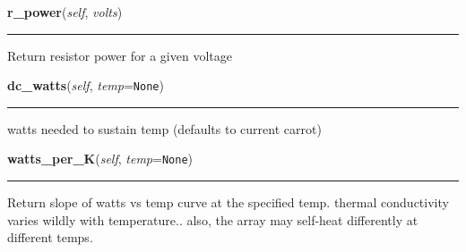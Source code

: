     \vspace{0.5ex}

    \begin{boxedminipage}{\textwidth}

    \raggedright \textbf{r\_power}(\textit{self}, \textit{volts})

    \vspace{-1.5ex}

    \rule{\textwidth}{0.5\fboxrule}
    Return resistor power for a given voltage

    \vspace{1ex}

    \end{boxedminipage}

    \label{tempcontrol:tcontroller:dc_watts}

    \vspace{0.5ex}

    \begin{boxedminipage}{\textwidth}

    \raggedright \textbf{dc\_watts}(\textit{self}, \textit{temp}=\texttt{None})

    \vspace{-1.5ex}

    \rule{\textwidth}{0.5\fboxrule}
    watts needed to sustain temp (defaults to current carrot)

    \vspace{1ex}

    \end{boxedminipage}

    \label{tempcontrol:tcontroller:watts_per_K}

    \vspace{0.5ex}

    \begin{boxedminipage}{\textwidth}

    \raggedright \textbf{watts\_per\_K}(\textit{self}, \textit{temp}=\texttt{None})

    \vspace{-1.5ex}

    \rule{\textwidth}{0.5\fboxrule}
    Return slope of watts vs temp curve at the specified temp. thermal 
    conductivity varies wildly with temperature.. also, the array may 
    self-heat differently at different temps.

    \vspace{1ex}

    \end{boxedminipage}

